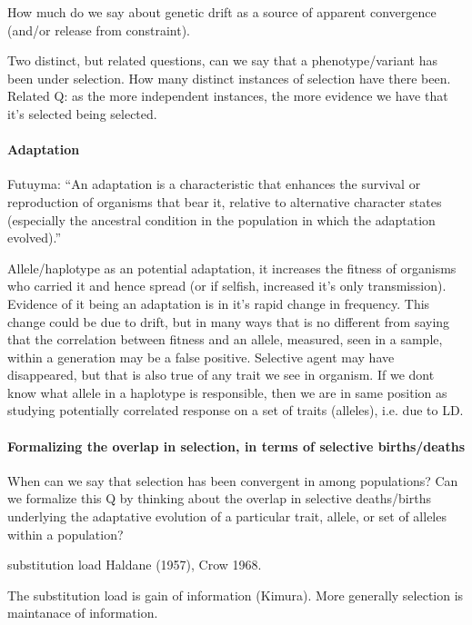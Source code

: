 \documentclass[a4paper,10pt]{article}
\begin{document}
How much do we say about genetic drift as a source of apparent convergence (and/or release from constraint).

Two distinct, but related questions, can we say that a phenotype/variant has been under selection. How many distinct instances of selection have there been. 
Related Q: as the more independent instances, the more evidence we have that it's
selected being selected.  

\paragraph{Adaptation}
Futuyma: 
``An adaptation is a characteristic that enhances the survival or reproduction
of organisms that bear it, relative to alternative character states (especially the
ancestral condition in the population in which the adaptation evolved).''

Allele/haplotype as an potential adaptation, it increases the fitness of
organisms who carried it and hence spread (or if selfish, increased it's only
transmission). Evidence of it being an adaptation is in it's rapid change in frequency. 
This change could be due to drift, but in many ways that is no
different from saying that the correlation between fitness and an
allele, measured, seen in a sample, within a generation may be a false
positive. Selective agent may have disappeared, but that is also true
of any trait we see in organism. 
If we dont know what allele in a haplotype is responsible, then we are
in same position as studying potentially correlated response on a set
of traits (alleles), i.e. due to LD.



\paragraph{Formalizing the overlap in selection, in terms of selective
births/deaths}
When can we say that selection has been convergent in among populations?
Can we formalize this Q by thinking about the overlap in selective
deaths/births underlying the adaptative evolution of a particular trait, allele, or set of alleles within a population?

\citet{Haldane1957} substitution load Haldane (1957), Crow 1968.

The substitution load is gain of information (Kimura). More generally
selection is maintanace of information.

\end{document}
